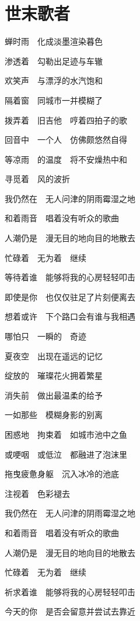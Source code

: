 \section{\texorpdfstring{\fontcn}{}世末歌者}
{\fontcn

蝉时雨　化成淡墨渲染暮色

渗透着　勾勒出足迹与车辙

欢笑声　与漂浮的水汽饱和

隔着窗　同城市一并模糊了

\bigskip

拨弄着　旧吉他　哼着四拍子的歌

回音中　一个人　仿佛颇悠然自得

等凉雨　的温度　将不安燥热中和

寻觅着　风的波折

\bigskip

我仍然在　无人问津的阴雨霉湿之地

和着雨音　唱着没有听众的歌曲

人潮仍是　漫无目的地向目的地散去

忙碌着　无为着　继续

\bigskip

等待着谁　能够将我的心房轻轻叩击

即使是你　也仅仅驻足了片刻便离去

想着或许　下个路口会有谁与我相遇

哪怕只　一瞬的　奇迹

\bigskip

夏夜空　出现在遥远的记忆

绽放的　璀璨花火拥着繁星

消失前　做出最温柔的给予

一如那些　模糊身影的别离

\bigskip

困惑地　拘束着　如城市池中之鱼

或哽咽　或低泣　都融进了泡沫里

拖曳疲惫身躯　沉入冰冷的池底

注视着　色彩褪去

\bigskip

我仍然在　无人问津的阴雨霉湿之地

和着雨音　唱着没有听众的歌曲

人潮仍是　漫无目的地向目的地散去

忙碌着　无为着　继续

\bigskip

祈求着谁　能够将我的心房轻轻叩击

今天的你　是否会留意并尝试去靠近

}
